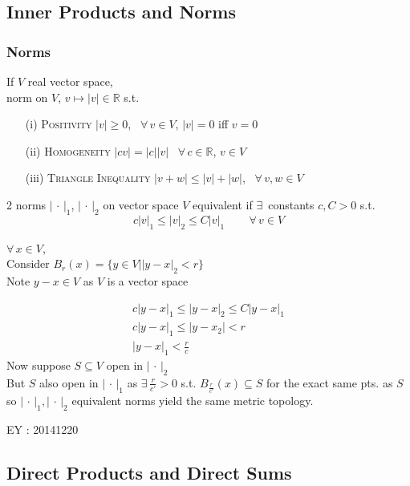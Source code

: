 \subsection*{Inner Products and Norms}


\subsubsection*{Norms}

If $V$ real vector space, \\
\phantom{\quad } norm on $V$, $v \mapsto |v| \in \mathbb{R}$ s.t.
\begin{enumerate}
\item[(i)] \textsc{Positivity} $|v| \geq 0$, \, $\forall \, v \in V$, $|v| =0$ iff $v=0$ 
\item[(ii)] \textsc{Homogeneity} $|cv| = |c| |v|$ \quad \, $\forall \, c \in \mathbb{R}$, $v\in V$
\item[(iii)] \textsc{Triangle Inequality} $|v+w | \leq |v| + |w|$, \, $\forall \, v,w \in V$
\end{enumerate}

2 norms $| \, \cdot \, |_1$, $| \, \cdot \, |_2$ on vector space $V$ equivalent if $\exists \, $ constants $c,C >0$ s.t. 
\[
c|v|_1 \leq |v|_2 \leq C|v|_1 \quad \quad \, \forall \, v \in V
\]

 $\forall \, x \in V$, \\
Consider $B_r(x) = \{ y \in V | |y-x|_2 < r \}$ \\
\phantom{ \quad } Note $y-x \in V$ as $V$ is a vector space

\[
\begin{gathered}
  c|y-x|_1 \leq |y-x|_2 \leq C |y-x|_1 \\ 
 c|y-x|_1 \leq |y-x_2| < r \\
 |y-x|_1 < \frac{r}{c}
\end{gathered}
\]
Now suppose $S \subseteq V$ open in $| \, \cdot \, |_2$ \\
\phantom{ \quad } But $S$ also open in $| \, \cdot \, |_1$ as $\exists \, \frac{r}{c'} >0$ s.t. $B_{\frac{r}{c'}}(x) \subseteq S$ for the exact same pts. as $S$ \\
so $| \, \cdot \, |_1, | \, \cdot \, |_2$ equivalent norms yield the same metric topology.  

EY : 20141220



\subsection*{Direct Products and Direct Sums}



